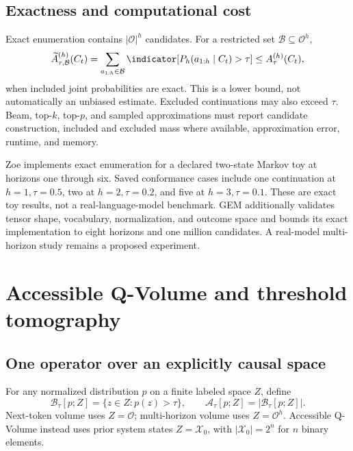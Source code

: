 \subsection{Exactness and computational cost}
Exact enumeration contains $|\mathcal O|^h$ candidates. For a restricted set $\mathcal B\subseteq\mathcal O^h$,
\begin{equation}
\widetilde A^{(h)}_{\tau,\mathcal B}(C_t)=
\sum_{a_{1:h}\in\mathcal B}\indicator[P_h(a_{1:h}\mid C_t)>\tau]
\leq A^{(h)}_\tau(C_t),
\label{eq:restricted-horizon}
\end{equation}
when included joint probabilities are exact. This is a lower bound, not automatically an unbiased estimate. Excluded continuations may also exceed $\tau$. Beam, top-$k$, top-$p$, and sampled approximations must report candidate construction, included and excluded mass where available, approximation error, runtime, and memory.

Zoe implements exact enumeration for a declared two-state Markov toy at horizons one through six. Saved conformance cases include one continuation at $h=1,\tau=0.5$, two at $h=2,\tau=0.2$, and five at $h=3,\tau=0.1$. These are exact toy results, not a real-language-model benchmark. GEM additionally validates tensor shape, vocabulary, normalization, and outcome space and bounds its exact implementation to eight horizons and one million candidates. A real-model multi-horizon study remains a proposed experiment.

\section{Accessible Q-Volume and threshold tomography}
\subsection{One operator over an explicitly causal space}
For any normalized distribution $p$ on a finite labeled space $Z$, define
\begin{equation}
\mathcal B_\tau[p;Z]=\{z\in Z:p(z)>\tau\},\qquad
\mathcal A_\tau[p;Z]=|\mathcal B_\tau[p;Z]|.
\label{eq:generic-accessible}
\end{equation}
Next-token volume uses $Z=\mathcal O$; multi-horizon volume uses $Z=\mathcal O^h$. Accessible Q-Volume instead uses prior system states $Z=\mathcal X_0$, with $|\mathcal X_0|=2^n$ for $n$ binary elements.

